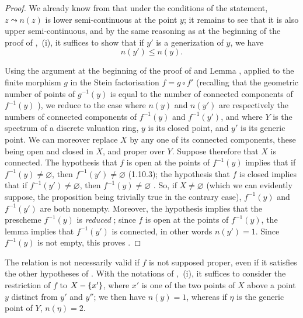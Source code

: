 \begin{proof}
We already know from  that under the conditions of the statement, $z\leadsto n(z)$ is lower semi-continuous at the point $y$; it remains to see that it is also upper semi-continuous, and by the same reasoning as at the beginning of the proof of ,~(i), it suffices to show that if $y'$ is a generization of $y$, we have
\begin{equation}
\tag{15.5.7.1}
\label{IV.15.5.7.1}
  n(y') \leq n(y).
\end{equation}

Using the argument at the beginning of the proof of  and Lemma , applied to the finite morphism $g$ in the Stein factorisation $f=g\circ f'$ (recalling that the geometric number of points of $g^{-1}(y)$ is equal to the number of connected components of $f^{-1}(y)$ ), we reduce to the case where $n(y)$ and $n(y')$ are respectively the numbers of connected components of $f^{-1}(y)$ and $f^{-1}(y')$, and where $Y$ is the spectrum of a discrete valuation ring, $y$ is its closed point, and $y'$ is its generic point.
We can moreover replace $X$ by any one of its connected components, these being open and closed in $X$, and proper over $Y$.
Suppose therefore that $X$ is connected. The hypothesis that $f$ is open at the points of $f^{-1}(y)$ implies that if $f^{-1}(y)\neq\varnothing$, then $f^{-1}(y')\neq\varnothing$ (1.10.3); the hypothesis that $f$ is closed implies that if $f^{-1}(y')\neq\varnothing$, then $f^{-1}(y)\neq\varnothing$ .
So, if $X\neq\varnothing$ (which we can evidently suppose, the proposition being trivially true in the contrary case), $f^{-1}(y)$ and $f^{-1}(y')$ are both nonempty.
Moreover, the hypothesis implies that the prescheme $f^{-1}(y)$ is \emph{reduced} ; since $f$ is open at the points of $f^{-1}(y)$, the lemma  implies that $f^{-1}(y')$ is connected, in other words $n(y')=1$.
Since $f^{-1}(y)$ is not empty, this proves .
\end{proof}

\begin{remarks}[15.5.8]
\label{IV.15.5.8}
The relation  is not necessarily valid if $f$ is not supposed proper, even if it satisfies the other hypotheses of .
With the notations of ,~(i), it suffices to consider the restriction of $f$ to $X-\{x'\}$, where $x'$ is one of the two points of $X$ above a point $y$ distinct from $y'$ and $y''$; we then have $n(y)=1$, whereas if $\eta$ is the generic point of $Y$, $n(\eta)=2$.
\end{remarks}

